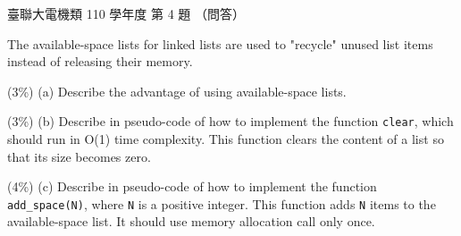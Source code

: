 \begin{pastexam}[label={px:ust-110-ee-ds-04}]{臺聯大電機類 110 學年度 第 4 題}
（問答）

The available-space lists for linked lists are used to "recycle" unused list items instead of releasing
their memory.

(3\%) (a) Describe the advantage of using available-space lists.

(3\%) (b) Describe in pseudo-code of how to implement the function \texttt{clear}, which should run in O(1)
time complexity. This function clears the content of a list so that its size becomes zero.

(4\%) (c) Describe in pseudo-code of how to implement the function \texttt{add\_space(N)}, where \texttt{N}
is a positive integer. This function adds \texttt{N} items to the available-space list. It should use
memory allocation call only once.
\end{pastexam}

